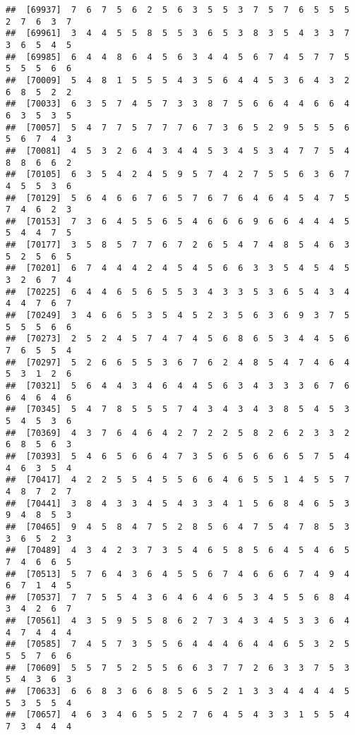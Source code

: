 \documentclass[
]{book}
\begin{document}
\begin{verbatim}
##  [69937]  7  6  7  5  6  2  5  6  3  5  5  3  7  5  7  6  5  5  5  2  7  6  3  7
##  [69961]  3  4  4  5  5  8  5  5  3  6  5  3  8  3  5  4  3  3  7  3  6  5  4  5
##  [69985]  6  4  4  8  6  4  5  6  3  4  4  5  6  7  4  5  7  7  5  5  5  5  6  6
##  [70009]  5  4  8  1  5  5  5  4  3  5  6  4  4  5  3  6  4  3  2  6  8  5  2  2
##  [70033]  6  3  5  7  4  5  7  3  3  8  7  5  6  6  4  4  6  6  4  6  3  5  3  5
##  [70057]  5  4  7  7  5  7  7  7  6  7  3  6  5  2  9  5  5  5  6  5  6  7  4  3
##  [70081]  4  5  3  2  6  4  3  4  4  5  3  4  5  3  4  7  7  5  4  8  8  6  6  2
##  [70105]  6  3  5  4  2  4  5  9  5  7  4  2  7  5  5  6  3  6  7  4  5  5  3  6
##  [70129]  5  6  4  6  6  7  6  5  7  6  7  6  4  6  4  5  4  7  5  7  4  6  2  3
##  [70153]  7  3  6  4  5  5  6  5  4  6  6  6  9  6  6  4  4  4  5  5  4  4  7  5
##  [70177]  3  5  8  5  7  7  6  7  2  6  5  4  7  4  8  5  4  6  3  5  2  5  6  5
##  [70201]  6  7  4  4  4  2  4  5  4  5  6  6  3  3  5  4  5  4  5  3  2  6  7  4
##  [70225]  6  4  4  6  5  6  5  5  3  4  3  3  5  3  6  5  4  3  4  4  4  7  6  7
##  [70249]  3  4  6  6  5  3  5  4  5  2  3  5  6  3  6  9  3  7  5  5  5  5  6  6
##  [70273]  2  5  2  4  5  7  4  7  4  5  6  8  6  5  3  4  4  5  6  7  6  5  5  4
##  [70297]  5  2  6  6  5  5  3  6  7  6  2  4  8  5  4  7  4  6  4  5  3  1  2  6
##  [70321]  5  6  4  4  3  4  6  4  4  5  6  3  4  3  3  3  6  7  6  6  4  6  4  6
##  [70345]  5  4  7  8  5  5  5  7  4  3  4  3  4  3  8  5  4  5  3  5  4  5  3  6
##  [70369]  4  3  7  6  4  6  4  2  7  2  2  5  8  2  6  2  3  3  2  6  8  5  6  3
##  [70393]  5  4  6  5  6  6  4  7  3  5  6  5  6  6  6  5  7  5  4  4  6  3  5  4
##  [70417]  4  2  2  5  5  4  5  5  6  6  4  6  5  5  1  4  5  5  7  4  8  7  2  7
##  [70441]  3  8  4  3  3  4  5  4  3  3  4  1  5  6  8  4  6  5  3  9  4  8  5  3
##  [70465]  9  4  5  8  4  7  5  2  8  5  6  4  7  5  4  7  8  5  3  3  6  5  2  3
##  [70489]  4  3  4  2  3  7  3  5  4  6  5  8  5  6  4  5  4  6  5  7  4  6  6  5
##  [70513]  5  7  6  4  3  6  4  5  5  6  7  4  6  6  6  7  4  9  4  6  7  1  4  5
##  [70537]  7  7  5  5  4  3  6  4  6  4  6  5  3  4  5  5  6  8  4  3  4  2  6  7
##  [70561]  4  3  5  9  5  5  8  6  2  7  3  4  3  4  5  3  3  6  4  4  7  4  4  4
##  [70585]  7  4  5  7  3  5  5  6  4  4  4  6  4  4  6  5  3  2  5  5  5  7  6  6
##  [70609]  5  5  7  5  2  5  5  6  6  3  7  7  2  6  3  3  7  5  3  5  4  3  6  3
##  [70633]  6  6  8  3  6  6  8  5  6  5  2  1  3  3  4  4  4  4  5  5  3  5  5  4
##  [70657]  4  6  3  4  6  5  5  2  7  6  4  5  4  3  3  1  5  5  4  7  3  4  4  4

\end{verbatim}
\end{document}
